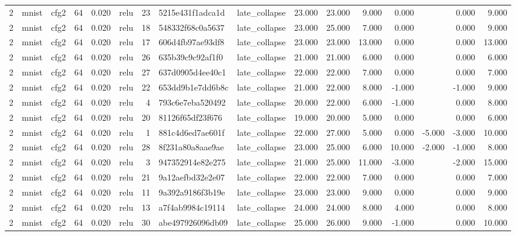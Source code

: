 \begin{table}[htbp]
{\begin{tabular}{@{}rllrrlrllrrrrrrr@{}}
2 & mnist & cfg2 & 64 & 0.020 & relu & 23 & 5215e431f1adca1d & late\_collapse & 23.000 & 23.000 & 9.000 & 0.000 &  & 0.000 & 9.000 \\
2 & mnist & cfg2 & 64 & 0.020 & relu & 18 & 548332f68c0a5637 & late\_collapse & 23.000 & 25.000 & 7.000 & 0.000 &  & 0.000 & 9.000 \\
2 & mnist & cfg2 & 64 & 0.020 & relu & 17 & 606d4fb97ae93df8 & late\_collapse & 23.000 & 23.000 & 13.000 & 0.000 &  & 0.000 & 13.000 \\
2 & mnist & cfg2 & 64 & 0.020 & relu & 26 & 635b39c9c92af1f0 & late\_collapse & 21.000 & 21.000 & 6.000 & 0.000 &  & 0.000 & 6.000 \\
2 & mnist & cfg2 & 64 & 0.020 & relu & 27 & 637d0905d4ee40c1 & late\_collapse & 22.000 & 22.000 & 7.000 & 0.000 &  & 0.000 & 7.000 \\
2 & mnist & cfg2 & 64 & 0.020 & relu & 22 & 653dd9b1e7dd6b8c & late\_collapse & 21.000 & 22.000 & 8.000 & -1.000 &  & -1.000 & 9.000 \\
2 & mnist & cfg2 & 64 & 0.020 & relu & 4 & 793c6e7eba520492 & late\_collapse & 20.000 & 22.000 & 6.000 & -1.000 &  & 0.000 & 8.000 \\
2 & mnist & cfg2 & 64 & 0.020 & relu & 20 & 81126f65df23f676 & late\_collapse & 19.000 & 20.000 & 5.000 & 0.000 &  & 0.000 & 6.000 \\
2 & mnist & cfg2 & 64 & 0.020 & relu & 1 & 881c4d6ed7ae601f & late\_collapse & 22.000 & 27.000 & 5.000 & 0.000 & -5.000 & -3.000 & 10.000 \\
2 & mnist & cfg2 & 64 & 0.020 & relu & 28 & 8f231a80a8aae9ae & late\_collapse & 23.000 & 25.000 & 6.000 & 10.000 & -2.000 & -1.000 & 8.000 \\
2 & mnist & cfg2 & 64 & 0.020 & relu & 3 & 947352914e82e275 & late\_collapse & 21.000 & 25.000 & 11.000 & -3.000 &  & -2.000 & 15.000 \\
2 & mnist & cfg2 & 64 & 0.020 & relu & 21 & 9a12aefbd32e2e07 & late\_collapse & 22.000 & 22.000 & 7.000 & 0.000 &  & 0.000 & 7.000 \\
2 & mnist & cfg2 & 64 & 0.020 & relu & 11 & 9a392a9186f3b19e & late\_collapse & 23.000 & 23.000 & 9.000 & 0.000 &  & 0.000 & 9.000 \\
2 & mnist & cfg2 & 64 & 0.020 & relu & 13 & a7f4ab9984c19114 & late\_collapse & 24.000 & 24.000 & 8.000 & 4.000 &  & 0.000 & 8.000 \\
2 & mnist & cfg2 & 64 & 0.020 & relu & 30 & abe497926096db09 & late\_collapse & 25.000 & 26.000 & 9.000 & -1.000 &  & 0.000 & 10.000 \\

\end{tabular}}
\end{table}
